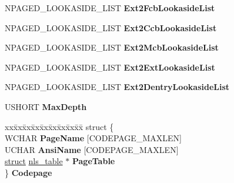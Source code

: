\begin{DoxyCompactItemize}
\item 
\mbox{\label{struct___e_x_t2___g_l_o_b_a_l_a67e63346cf04df877d8a4055287e9c69}} 
N\+P\+A\+G\+E\+D\+\_\+\+L\+O\+O\+K\+A\+S\+I\+D\+E\+\_\+\+L\+I\+ST {\bfseries Ext2\+Fcb\+Lookaside\+List}
\item 
\mbox{\label{struct___e_x_t2___g_l_o_b_a_l_ab4de1a846401536381aee4ea5501d689}} 
N\+P\+A\+G\+E\+D\+\_\+\+L\+O\+O\+K\+A\+S\+I\+D\+E\+\_\+\+L\+I\+ST {\bfseries Ext2\+Ccb\+Lookaside\+List}
\item 
\mbox{\label{struct___e_x_t2___g_l_o_b_a_l_a2a5aabb55212adb836b864d7c92c668e}} 
N\+P\+A\+G\+E\+D\+\_\+\+L\+O\+O\+K\+A\+S\+I\+D\+E\+\_\+\+L\+I\+ST {\bfseries Ext2\+Mcb\+Lookaside\+List}
\item 
\mbox{\label{struct___e_x_t2___g_l_o_b_a_l_a271b311d2072b59c8adf0b2a438261d6}} 
N\+P\+A\+G\+E\+D\+\_\+\+L\+O\+O\+K\+A\+S\+I\+D\+E\+\_\+\+L\+I\+ST {\bfseries Ext2\+Ext\+Lookaside\+List}
\item 
\mbox{\label{struct___e_x_t2___g_l_o_b_a_l_a7ee0f8b36ad0a600c98aa11f1e9d5ebe}} 
N\+P\+A\+G\+E\+D\+\_\+\+L\+O\+O\+K\+A\+S\+I\+D\+E\+\_\+\+L\+I\+ST {\bfseries Ext2\+Dentry\+Lookaside\+List}
\item 
\mbox{\label{struct___e_x_t2___g_l_o_b_a_l_a9cacde86abc13af514a70d3ae77140aa}} 
U\+S\+H\+O\+RT {\bfseries Max\+Depth}
\item 
\mbox{\label{struct___e_x_t2___g_l_o_b_a_l_a54fb6d88f7665c834fa46bef923ce33b}} 
\begin{tabbing}
xx\=xx\=xx\=xx\=xx\=xx\=xx\=xx\=xx\=\kill
struct \{\\
\>WCHAR {\bfseries PageName} \mbox{[}CODEPAGE\_MAXLEN\mbox{]}\\
\>UCHAR {\bfseries AnsiName} \mbox{[}CODEPAGE\_MAXLEN\mbox{]}\\
\>\hyperlink{interfacestruct}{struct} \hyperlink{structnls__table}{nls\_table} $\ast$ {\bfseries PageTable}\\
\} {\bfseries Codepage}\\


\end{tabbing}
\end{DoxyCompactItemize}
